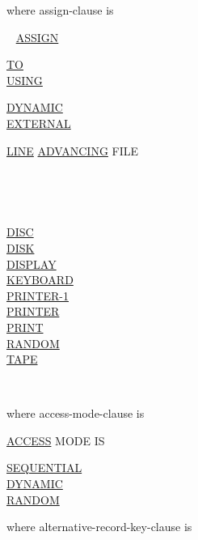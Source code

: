 \documentclass[a4paper,oneside,svgnames]{scrbook}
\makeatletter
\newcommand{\key}[1]{\underline{#1}}
\newcommand{\xopen}[1]{%
  \colorbox{green!75}{#1}}
\newcommand{\miscext}[1]{%
  \colorbox{blue!50}{#1}}
\newenvironment{0-1}{$\left[ \begin{tabular}{@{}l@{}}}{\end{tabular} \right]$}
\newenvironment{1=}{$\left\{ \begin{tabular}{@{}l@{}}}{\end{tabular} \right\}$}
\makeatother
\begin{document}
where assign-clause is

\ {}\newline
\key{ASSIGN}
\begin{0-1}
  \key{TO} \\
  \key{USING}
\end{0-1}
\miscext{
  \begin{0-1}
    \key{DYNAMIC} \\
    \key{EXTERNAL}
  \end{0-1}
}
\begin{1=}
  \miscext{
    \begin{0-1}
      \key{LINE} \key{ADVANCING} FILE
    \end{0-1}
  }
  \begin{1=}
    \literal \\
    \identifier
  \end{1=}\\

  \begin{1=}
    \key{DISC} \\
    \xopen{\key{DISK}} \\
    \miscext{\key{DISPLAY}} \\
    \miscext{\key{KEYBOARD}} \\
    \miscext{\key{PRINTER-1}} \\
    \xopen{\key{PRINTER}} \\
    \key{PRINT} \\
    \key{RANDOM} \\
    \key{TAPE}
  \end{1=}
  \begin{0-1}
    \literal \\
    \identifier
  \end{0-1}
\end{1=}

where access-mode-clause is

\key{ACCESS} MODE IS
\begin{1=}
  \key{SEQUENTIAL} \\
  \key{DYNAMIC} \\
  \key{RANDOM}
\end{1=}

where alternative-record-key-clause is
\end{document}
